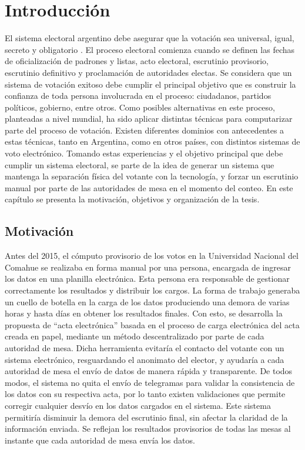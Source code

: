 \label{Introduccion}
\chapter{Introducción}
El sistema electoral argentino debe asegurar que la votación sea universal, igual, secreto y obligatorio \citep{arlettaz2012libertad}. El proceso electoral comienza cuando se definen las fechas de oficialización de padrones y listas, acto electoral, escrutinio provisorio, escrutinio definitivo y proclamación de autoridades electas. Se considera que un sistema de votación exitoso debe cumplir el principal objetivo que es construir la confianza de toda persona involucrada en el proceso: ciudadanos, partidos políticos, gobierno, entre otros. Como posibles alternativas en este proceso, planteadas a nivel mundial, ha sido aplicar distintas técnicas para computarizar parte del proceso de votación. Existen diferentes dominios con antecedentes a estas técnicas, tanto en Argentina, como en  otros  países,  con  distintos  sistemas  de  voto  electrónico. Tomando estas experiencias y el objetivo principal que debe cumplir un sistema electoral, se parte de la idea de generar un sistema que mantenga la separación física del votante con la tecnología, y forzar un escrutinio manual por parte de las autoridades de mesa en el momento del conteo. \newline
En este capítulo se presenta la motivación, objetivos y organización de la tesis.

\section{Motivación}
Antes del 2015, el cómputo provisorio de los votos en la Universidad Nacional del Comahue se realizaba en forma manual por una persona, encargada de ingresar los datos en una planilla electrónica. Esta persona era responsable de gestionar correctamente los resultados y distribuir los cargos. La forma de trabajo generaba un cuello de botella en la carga de los datos produciendo una demora de varias horas y hasta días en obtener los resultados finales. \newline
Con esto, se desarrolla la propuesta de ``acta electrónica'' basada en el proceso de carga electrónica del acta creada en papel, mediante un método descentralizado  por parte de cada autoridad de mesa. Dicha herramienta evitaría el contacto del votante con un sistema electrónico, resguardando el anonimato del elector, y ayudaría a cada autoridad de mesa el envío de datos de manera rápida y transparente. De todos modos, el sistema no quita el envío de telegramas para validar la consistencia de los datos con su respectiva acta, por lo tanto existen validaciones que permite corregir cualquier desvío en los datos cargados en el sistema. Este sistema permitiría disminuir la demora del escrutinio final, sin afectar la claridad de la información enviada. Se reflejan los resultados provisorios de todas las mesas al instante que cada autoridad de mesa envía los datos.

